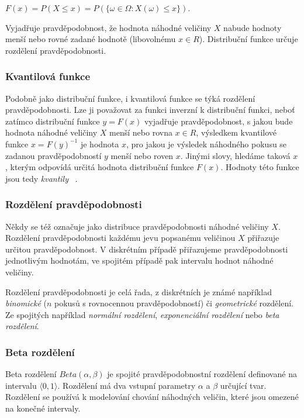 \documentclass[thesis=M,czech]{FITthesis}[2014/05/07]
\begin{document}
\begin{center}
$F(x) = P(X \leq x) = P(\{ \omega \in \Omega: X(\omega) \leq x \})$.
\end{center}

Vyjadřuje pravděpodobnost, že hodnota náhodné veličiny $X$ nabude hodnoty menší nebo rovné zadané hodnotě (libovolnému $x \in R$). Distribuční funkce určuje rozdělení pravděpodobnosti.

\subsubsection{Kvantilová funkce}
\label{icdf}
Podobně jako distribuční funkce, i kvantilová funkce se týká rozdělení pravděpodobnosti. Lze ji považovat za funkci inverzní k distribuční funkci, neboť zatímco distribuční funkce $y = F(x)$ vyjadřuje pravděpodobnost, s jakou bude hodnota náhodné veličiny $X$ menší nebo rovna $x \in R$, výsledkem kvantilové funkce $x = F(y)^{-1}$ je hodnota $x$, pro jakou je výsledek náhodného pokusu se zadanou pravděpodobností $y$ menší nebo roven $x$. Jinými slovy, hledáme taková $x$, kterým odpovídá určitá hodnota distribuční funkce $F(x)$. Hodnoty této funkce jsou tedy \emph{kvantily}~\cite{pst2} .

\subsubsection{Rozdělení pravděpodobnosti}
\label{distr}
Někdy se též označuje jako distribuce pravděpodobnosti náhodné veličiny $X$. 
Rozdělení pravděpodobnosti každému jevu popsanému veličinou $X$ přiřazuje určitou pravděpodobnost. V diskrétním případě přiřazujeme pravděpodobnosti jednotlivým hodnotám, ve spojitém případě pak intervalu hodnot náhodné veličiny. 

Rozdělení pravděpodobnosti je celá řada, z diskrétních je známé například \emph{binomické} ($n$ pokusů s rovnocennou pravděpodobností) či \emph{geometrické} rozdělení. Ze spojitých například \emph{normální rozdělení}, \emph{exponenciální rozdělení} nebo \emph{beta rozdělení}.

\subsubsection{Beta rozdělení}
\label{beta}
Beta rozdělení ${Beta}(\alpha, \beta)$ je spojité pravděpodobnostní rozdělení definované na intervalu $\langle0,1\rangle$. Rozdělení má dva vstupní parametry $\alpha$ a $\beta$ určující tvar. Rozdělení se používá k modelování chování náhodných veličin, které jsou omezené na konečné intervaly. 
\end{document}
